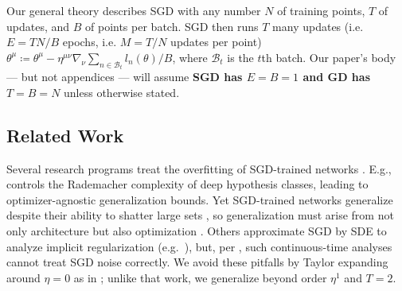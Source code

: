 \documentclass{article}
\theoremstyle{plain}
\theoremstyle{definition}
\newcommand{\Bb}{\mathcal{B}}
\begin{document}

        Our general theory describes SGD with any number
             $N$ of training points,
             $T$ of updates, and 
             $B$ of points per batch.
        SGD then runs $T$ many updates (i.e. $E=TN/B$ epochs, i.e. $M=T/N$
        updates per point)
        $
            \theta^\mu
            \coloneqq
            \theta^\mu -
            \eta^{\mu\nu} \nabla_\nu
                \sum_{n\in \Bb_t} l_n(\theta) / B
        $,
        where $\Bb_t$ is the $t$th batch.  Our paper's body --- but not
        appendices --- will assume \textbf{SGD has $E=B=1$ and GD has $T=B=N$}
        unless otherwise stated.


\subsection{Related Work} \label{sect:related}


    Several research programs treat the overfitting of SGD-trained networks
    \citep{ne17a}.  E.g., \cite{ba17} controls the Rademacher complexity of
    deep hypothesis classes, leading to optimizer-agnostic generalization
    bounds.  Yet SGD-trained networks generalize despite their ability to
    shatter large sets \citep{zh17}, so generalization must arise from not only
    architecture but also optimization \citep{ne17b}.  Others approximate
    SGD by SDE to analyze implicit regularization (e.g.\ \cite{ch18}), but,
    per \cite{ya19a}, such continuous-time analyses cannot treat SGD noise
    correctly.
    We avoid these pitfalls by Taylor expanding around $\eta=0$ as in
    \cite{ro18}; unlike that work, we generalize beyond order $\eta^1$ and
    $T=2$.
    
\end{document}
